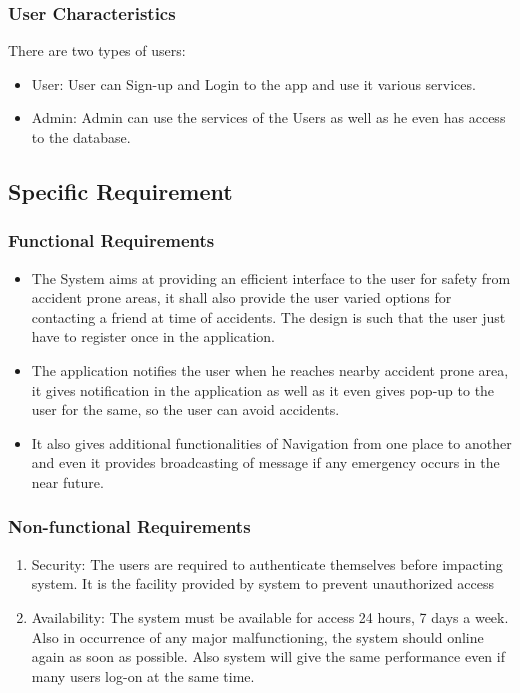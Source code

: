 \documentclass{article}
\begin{document}
\begin{flushleft}
            \subsubsection{User Characteristics}
            There are two types of users: 
            \begin{itemize}
                \item User: User can Sign-up and Login to the app and use it various services.
                \item Admin: Admin can use the services of the Users as well as he even has access to the database.
            \end{itemize}
            
            
        \subsection{Specific Requirement}
            \subsubsection{Functional Requirements}
            \begin{itemize}
                \item The System aims at providing an efficient interface to the user for safety from accident prone areas, it shall also provide the user varied options for contacting a friend at time of accidents. The design is such that the user just have to register once in the application.
                \item The application notifies the user when he reaches nearby accident prone area, it gives notification in the application as well as it even gives pop-up to the user for the same, so the user can avoid accidents.
                \item It also gives additional functionalities of Navigation from one place to another and even it provides broadcasting of message if any emergency occurs in the near future.
            \end{itemize}
            \subsubsection{Non-functional Requirements}
            \begin{enumerate}
                \item Security: The users are required to authenticate themselves before impacting system. It is the facility provided by system to prevent unauthorized access
                \item Availability: The system must be available for access 24 hours, 7 days a week. Also in occurrence of any major malfunctioning, the system should online again as soon as possible. Also system will give the same performance even if many users log-on at the same time.
            \end{enumerate}
            \newpage
            

\end{flushleft}
\end{document}
